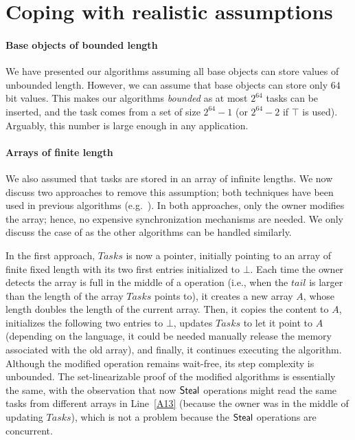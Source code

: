 \section{\label{sec-removing-infinite-arrays}Coping with realistic assumptions}

\paragraph*{Base objects of bounded length}
We have presented our algorithms assuming all base objects can store values of unbounded length.  However, we can assume that base objects can store only \(64\) bit values. This makes our algorithms \emph{bounded} as at most \(2^{64}\) tasks can be inserted, and the task comes from a set of size \(2^{64} - 1\) (or \(2^{64} - 2\) if \(\top\) is used).  Arguably, this number is large enough in any application.


\paragraph*{Arrays of finite length}
We also assumed that tasks are stored in an array of infinite lengths. We now discuss two approaches to remove this assumption; both techniques have been used in previous algorithms (e.g.~\cite{DBLP_conf_wdag_AdasF20, DBLP_conf_opodis_AfekKY10, maged.vechev.2009, non.blocking.work.stealing, DBLP_conf_ppopp_YangM16}).  In both approaches, only the owner modifies the array; hence, no expensive synchronization mechanisms are needed.  We only discuss the case of \WFWSM{} as the other algorithms can be handled similarly.

In the first approach, \(Tasks\) is now a pointer, initially pointing to an array of finite fixed length with its two first entries initialized to \(\bot\). Each time the owner detects the array is full in the middle of a \Put{} operation (i.e., when the \(tail\) is larger than the length of the array \(Tasks\) points to), it creates a new array \(A\), whose length doubles the length of the current array.  Then, it copies the content to \(A\), initializes the following two entries to \(\bot\), updates \(Tasks\) to let it point to \(A\) (depending on the language, it could be needed manually release the memory associated with the old array), and finally, it continues executing the algorithm. Although the modified \Put{} operation remains wait-free, its step complexity is unbounded.  The set-linearizable proof of the modified algorithms is essentially the same, with the observation that now ${\sf Steal}$ operations might read the same tasks from different arrays in Line~\ref{A13} (because the owner was in the middle of updating $Tasks$), which is not a problem because the ${\sf Steal}$ operations are concurrent.

